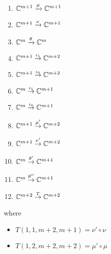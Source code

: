 \begin{enumerate}[label = (\arabic*)]
\item $\mathbb{C}^{m+1} \xrightarrow{\mu} \mathbb{C}^{m+1}$

\item $\mathbb{C}^{m+1} \xrightarrow{\nu} \mathbb{C}^{m+1}$

\item $\mathbb{C}^{m} \xrightarrow{\theta} \mathbb{C}^{m}$

\item $\mathbb{C}^{m+1} \overset{\iota_1}{\rightarrow} \mathbb{C}^{m+2}$

\item $\mathbb{C}^{m+1} \overset{\iota_0}{\rightarrow} \mathbb{C}^{m+2}$

\item $\mathbb{C}^{m} \overset{\iota_1}{\rightarrow} \mathbb{C}^{m+1}$

\item $\mathbb{C}^{m} \overset{\iota_0}{\rightarrow} \mathbb{C}^{m+1}$

\item $\mathbb{C}^{m+1} \overset{\mu'}{\rightarrow} \mathbb{C}^{m+2}$

\item $\mathbb{C}^{m+1} \overset{\nu'}{\rightarrow} \mathbb{C}^{m+2}$

\item $\mathbb{C}^{m} \overset{\theta'}{\rightarrow} \mathbb{C}^{m+1}$

\item $\mathbb{C}^{m} \overset{\theta''}{\rightarrow} \mathbb{C}^{m+1}$

\item $\mathbb{C}^{m+2} \overset{T}{\rightarrow} \mathbb{C}^{m+2}$
\end{enumerate}
where 
\begin{itemize}
\item $T(1,1,m+2,m+1) = \nu' \circ \nu$
\item $T(1,2,m+2,m+2) = \mu' \circ \mu$
\end{itemize}

